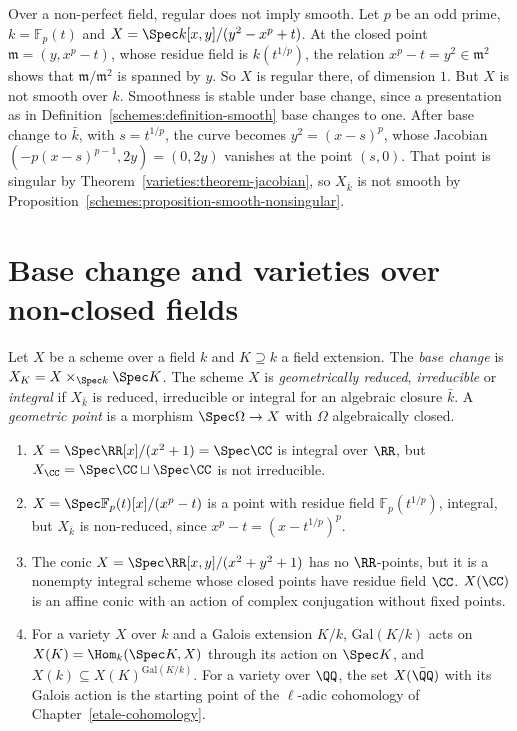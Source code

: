 \begin{counterexample}\label{schemes:counterexample-regular-not-smooth}
Over a non-perfect field, regular does not imply smooth. Let $p$ be an odd prime, $k = \mathbb{F}_p(t)$ and $X = \Spec k[x, y]/(y^2 - x^p + t)$. At the closed point
$\mathfrak{m} = (y, x^p - t)$, whose residue field is $k(t^{1/p})$, the relation $x^p - t = y^2 \in \mathfrak{m}^2$ shows that $\mathfrak{m}/\mathfrak{m}^2$ is spanned by $y$. So
$X$ is regular there, of dimension $1$. But $X$ is not smooth over $k$. Smoothness is stable under base change, since a presentation as in
Definition~\ref{schemes:definition-smooth} base changes to one. After base change to $\bar k$, with $s = t^{1/p}$, the curve becomes
$y^2 = (x - s)^p$, whose Jacobian $(-p(x - s)^{p-1}, 2y) = (0, 2y)$ vanishes at the point $(s, 0)$. That point is singular by
Theorem~\ref{varieties:theorem-jacobian}, so $X_{\bar k}$ is not smooth by Proposition~\ref{schemes:proposition-smooth-nonsingular}.
\end{counterexample}

\section{Base change and varieties over non-closed fields}\label{schemes:section-base-change}

\begin{definition}\label{schemes:definition-geometric}
Let $X$ be a scheme over a field $k$ and $K \supseteq k$ a field extension. The \emph{base change} is $X_K = X \times_{\Spec k}\Spec K$. The scheme $X$ is
\emph{geometrically reduced}, \emph{irreducible} or \emph{integral} if $X_{\bar k}$ is reduced, irreducible or integral for an algebraic closure $\bar k$. A
\emph{geometric point} is a morphism $\Spec\Omega \to X$ with $\Omega$ algebraically closed.
\end{definition}

\begin{example}\label{schemes:example-non-closed-fields}
\begin{enumerate}
\item $X = \Spec\RR[x]/(x^2 + 1) = \Spec\CC$ is integral over $\RR$, but $X_\CC = \Spec\CC \sqcup \Spec\CC$ is not irreducible.
\item $X = \Spec\mathbb{F}_p(t)[x]/(x^p - t)$ is a point with residue field $\mathbb{F}_p(t^{1/p})$, integral, but $X_{\bar k}$ is non-reduced, since $x^p - t = (x - t^{1/p})^p$.
\item The conic $X = \Spec\RR[x, y]/(x^2 + y^2 + 1)$ has no $\RR$-points, but it is a nonempty integral scheme whose closed points have residue field $\CC$.
$X(\CC)$ is an affine conic with an action of complex conjugation without fixed points.
\item For a variety $X$ over $k$ and a Galois extension $K/k$, $\mathrm{Gal}(K/k)$ acts on $X(K) = \Hom_k(\Spec K, X)$ through its action on $\Spec K$, and
$X(k) \subseteq X(K)^{\mathrm{Gal}(K/k)}$. For a variety over $\QQ$, the set $X(\bar{\QQ})$ with its Galois action is the starting point of the $\ell$-adic
cohomology of Chapter~\ref{etale-cohomology}.
\end{enumerate}
\end{example}

